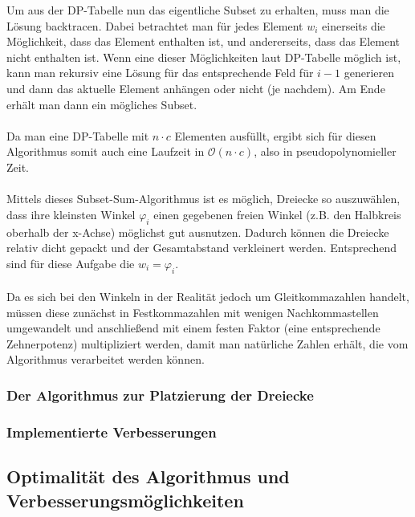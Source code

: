 \documentclass[a4paper, notitlepage, 12pt]{scrartcl}
\begin{document}
  Um aus der DP-Tabelle nun das eigentliche Subset zu erhalten, muss man die Lösung backtracen.\cite{Src:dpbacktrace} Dabei betrachtet man für jedes Element $w_i$ einerseits die Möglichkeit, dass das Element enthalten ist, und andererseits, dass das Element nicht enthalten ist. Wenn eine dieser Möglichkeiten laut DP-Tabelle möglich ist, kann man rekursiv eine Lösung für das entsprechende Feld für $i-1$ generieren und dann das aktuelle Element anhängen oder nicht (je nachdem). Am Ende erhält man dann ein mögliches Subset.
  \\ \\
  Da man eine DP-Tabelle mit $n \cdot c$ Elementen ausfüllt, ergibt sich für diesen Algorithmus somit auch eine Laufzeit in $\mathcal{O}(n \cdot c)$, also in pseudopolynomieller Zeit.
  \\ \\
  Mittels dieses Subset-Sum-Algorithmus ist es möglich, Dreiecke so auszuwählen, dass ihre kleinsten Winkel $\varphi_i$ einen gegebenen freien Winkel (z.B. den Halbkreis oberhalb der x-Achse) möglichst gut ausnutzen. Dadurch können die Dreiecke relativ dicht gepackt und der Gesamtabstand verkleinert werden. Entsprechend sind für diese Aufgabe die $w_i = \varphi_i$. \\ \\
   Da es sich bei den Winkeln in der Realität jedoch um Gleitkommazahlen handelt, müssen diese zunächst in Festkommazahlen mit wenigen Nachkommastellen umgewandelt und anschließend mit einem festen Faktor (eine entsprechende Zehnerpotenz) multipliziert werden, damit man natürliche Zahlen erhält, die vom Algorithmus verarbeitet werden können.
  \subsubsection{Der Algorithmus zur Platzierung der Dreiecke}
  \subsubsection{Implementierte Verbesserungen}
  \subsection{Optimalität des Algorithmus und Verbesserungsmöglichkeiten}
\end{document}
